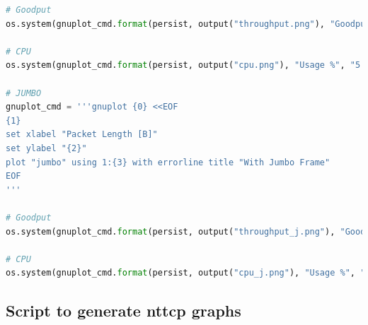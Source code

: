 \documentclass{exam}
\begin{document}
\begin{lstlisting}[language=python]
# Goodput
os.system(gnuplot_cmd.format(persist, output("throughput.png"), "Goodput [Gb/s]", "2:3:4"))

# CPU
os.system(gnuplot_cmd.format(persist, output("cpu.png"), "Usage %", "5:6:7"))

# JUMBO
gnuplot_cmd = '''gnuplot {0} <<EOF
{1}
set xlabel "Packet Length [B]"
set ylabel "{2}"
plot "jumbo" using 1:{3} with errorline title "With Jumbo Frame"
EOF
'''

# Goodput
os.system(gnuplot_cmd.format(persist, output("throughput_j.png"), "Goodput [Gb/s]", "2:3:4"))

# CPU
os.system(gnuplot_cmd.format(persist, output("cpu_j.png"), "Usage %", "5:6:7"))
\end{lstlisting}

\subsection{Script to generate nttcp graphs}
\end{document}
